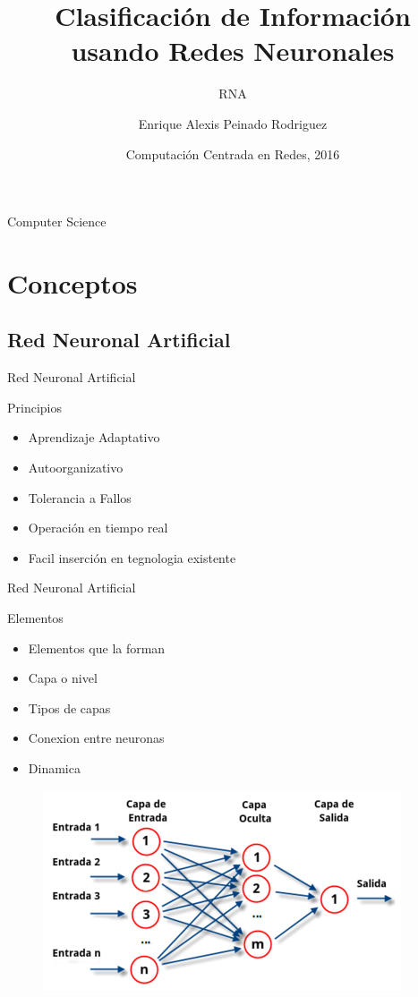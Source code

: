 \documentclass{beamer}
\title{Clasificación de Información usando Redes Neuronales}
\subtitle{RNA}
\author{Enrique Alexis Peinado Rodriguez}
\institute[Universida Naciona De Ingenieria]
{
  Ciencia de la Computación\\
  Universidad Naciona de Ingenieria
}
\date{Computación Centrada en Redes, 2016}
\begin{document}
\begin{frame}
  \titlepage
\end{frame}

\begin{frame}{Computer Science}
  \tableofcontents
\end{frame}

\section{Conceptos}

\subsection{Red Neuronal Artificial}

\begin{frame}{Red Neuronal Artificial}
\begin{block}{Principios}\pause
\begin{itemize}
\item {Aprendizaje Adaptativo\pause}
\item {Autoorganizativo\pause}
\item {Tolerancia a Fallos\pause}
\item {Operación en tiempo real\pause}
\item {Facil inserción en tegnologia existente}
\end{itemize}
\end{block}
\end{frame}

\begin{frame}{Red Neuronal Artificial}
\begin{block}{Elementos}\pause
\begin{itemize}
\item {Elementos que la forman\pause}
\item {Capa o nivel\pause}
\item {Tipos de capas\pause}
\item {Conexion entre neuronas\pause}
\item {Dinamica}
\end{itemize}
\begin{figure}
\includegraphics[scale=0.6]{elementos.png}
\centering
\end{figure}
\end{block}
\end{frame}
\end{document}
